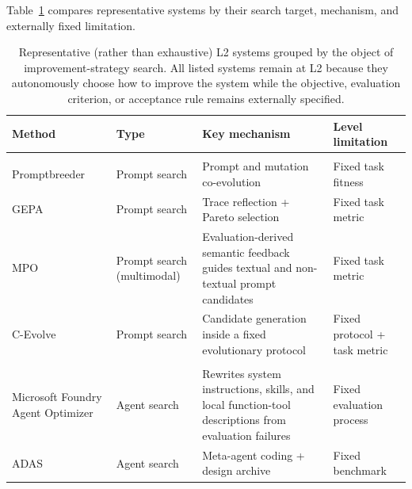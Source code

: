 Table~\ref{tab:l2-strategy-summary} compares representative systems by their search target, mechanism, and externally fixed limitation.

\begin{table}[t]
\centering
\caption{Representative (rather than exhaustive) L2 systems grouped by the object of improvement-strategy search. All listed systems remain at L2 because they autonomously choose how to improve the system while the objective, evaluation criterion, or acceptance rule remains externally specified.}
\label{tab:l2-strategy-summary}
\scriptsize
\setlength{\tabcolsep}{1.2pt}
\renewcommand{\arraystretch}{1.05}
\begin{tabularx}{0.9\textwidth}{@{}>{\raggedright\arraybackslash}p{}>{\raggedright\arraybackslash}p{}>{\raggedright\arraybackslash}p{}>{\raggedright\arraybackslash}X@{}}
\toprule
\textbf{Method} 
& \textbf{Type} 
& \textbf{Key mechanism} 
& \textbf{Level limitation}\\

\midrule
\multicolumn{4}{@{}l}{\textbf{Prompt Search}}\\

Promptbreeder~\cite{fernando2024promptbreeder}
& Prompt search
& Prompt and mutation co-evolution
& Fixed task fitness \\

GEPA~\cite{agrawal2026gepa}
& Prompt search
& Trace reflection + Pareto selection
& Fixed task metric \\

MPO~\cite{choi2026mpo}
& Prompt search (multimodal)
& Evaluation-derived semantic feedback guides textual and non-textual prompt candidates
& Fixed task metric \\

C-Evolve~\cite{li2026cevolve}
& Prompt search
& Candidate generation inside a fixed evolutionary protocol
& Fixed protocol + task metric \\

\midrule

\multicolumn{4}{@{}l}{\textbf{Agent and Harness Search}}\\
Microsoft Foundry Agent Optimizer~\cite{microsoft2026agentoptimizer}
& Agent search
& Rewrites system instructions, skills, and local function-tool descriptions from evaluation failures
& Fixed evaluation process \\

ADAS~\cite{hu2025adas}
& Agent search
& Meta-agent coding + design archive
& Fixed benchmark \\


\end{tabularx}
\end{table}
